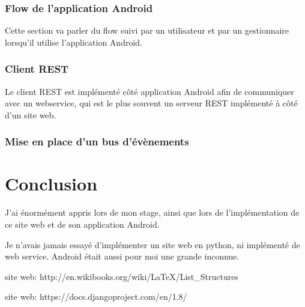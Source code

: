 \documentclass[12pt,table,a4paper]{report}
\begin{document}
\subsection{Flow de l'application Android}
Cette section va parler du flow suivi par un utilisateur et par un gestionnaire lorsqu'il utilise l'application Android.

\subsection{Client REST}
Le client REST est implémenté côté application Android afin de communiquer avec un webservice, qui est le plus souvent un serveur REST implémenté à côté d'un site web.

\subsection{Mise en place d'un bus d'évènements}

\chapter{Conclusion}
J'ai énormément appris lors de mon stage, ainsi que lors de l'implémentation de ce site web et de son application Android.

Je n'avais jamais essayé d'implémenter un site web en python, ni implémenté de web service. Android était aussi pour moi une grande inconnue.

\begin{thebibliography}{breitestes Label}
	site web: http://en.wikibooks.org/wiki/LaTeX/List\_Structures
	
		site web: https://docs.djangoproject.com/en/1.8/
\end{thebibliography}
\end{document}
